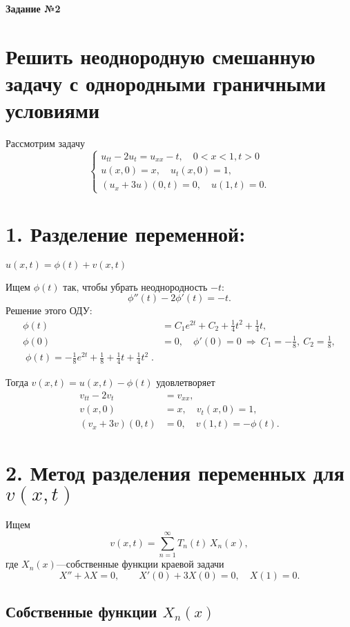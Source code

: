 \documentclass[a4paper,12pt]{article}
\begin{document}
\vspace{90mm}
\begin{center}    
\noindent \textbf{Задание №2}
\end{center}
\section*{Решить неоднородную смешанную задачу с однородными граничными условиями}
Рассмотрим задачу
\[
\begin{cases}
u_{tt} - 2u_t = u_{xx} - t, \quad 0 < x < 1, t > 0\\
u(x, 0) = x, \quad u_t(x, 0) = 1,\\
(u_x + 3u)(0, t) = 0, \quad u(1, t) = 0.
\end{cases}
\]
\section*{1. Разделение переменной: }
$u(x,t)=\phi(t)+v(x,t)$

Ищем $\phi(t)$ так, чтобы убрать неоднородность $-t$:
\[
\phi''(t) - 2\phi'(t) = -t.
\]
Решение этого ОДУ:
\begin{align*}
\phi(t) &= C_1 e^{2t} + C_2 + \frac{1}{4}t^2 + \frac{1}{4}t,\\
\phi(0)&=0,\quad \phi'(0)=0
\ \Longrightarrow\ 
C_1=-\frac18,\ C_2=\frac18,\\
\boxed{\;\phi(t)=-\frac18e^{2t}+\frac18+\frac14t+\frac14t^2\;.}
\end{align*}

Тогда $v(x,t)=u(x,t)-\phi(t)$ удовлетворяет
\begin{align*}
v_{tt} - 2v_t &= v_{xx},\\
v(x,0)&=x,\quad v_t(x,0)=1,\\
(v_x+3v)(0,t)&=0,\quad v(1,t)=-\phi(t).
\end{align*}

\section*{2. Метод разделения переменных для $v(x,t)$}

Ищем
\[
v(x,t)=\sum_{n=1}^\infty T_n(t)\,X_n(x),
\]
где $X_n(x)$---собственные функции краевой задачи
\[
X'' + \lambda X = 0,\qquad
X'(0) + 3X(0)=0,\quad X(1)=0.
\]

\subsection*{Собственные функции $X_n(x)$}
\end{document}
